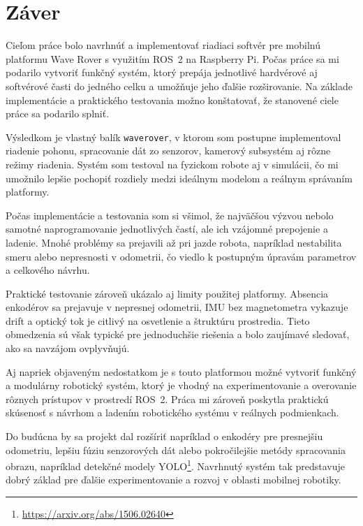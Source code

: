   \chapter{Záver}

  Cieľom práce bolo navrhnúť a implementovať riadiaci softvér pre mobilnú platformu Wave Rover s využitím ROS~2 na Raspberry Pi. Počas práce sa mi podarilo vytvoriť funkčný systém, ktorý prepája jednotlivé hardvérové aj softvérové časti do jedného celku a umožňuje jeho ďalšie rozširovanie. Na základe implementácie a praktického testovania možno konštatovať, že stanovené ciele práce sa podarilo splniť.

  Výsledkom je vlastný balík \texttt{waverover}, v ktorom som postupne implementoval riadenie pohonu, spracovanie dát zo senzorov, kamerový subsystém aj rôzne režimy riadenia. Systém som testoval na fyzickom robote aj v simulácii, čo mi umožnilo lepšie pochopiť rozdiely medzi ideálnym modelom a reálnym správaním platformy.

  Počas implementácie a testovania som si všimol, že najväčšou výzvou nebolo samotné naprogramovanie jednotlivých častí, ale ich vzájomné prepojenie a ladenie. Mnohé problémy sa prejavili až pri jazde robota, napríklad nestabilita smeru alebo nepresnosti v odometrii, čo viedlo k postupným úpravám parametrov a celkového návrhu.

  Praktické testovanie zároveň ukázalo aj limity použitej platformy. Absencia enkodérov sa prejavuje v nepresnej odometrii, IMU bez magnetometra vykazuje drift a optický tok je citlivý na osvetlenie a štruktúru prostredia. Tieto obmedzenia sú však typické pre jednoduchšie riešenia a bolo zaujímavé sledovať, ako sa navzájom ovplyvňujú.

  Aj napriek objaveným nedostatkom je s touto platformou možné vytvoriť funkčný a modulárny robotický systém, ktorý je vhodný na experimentovanie a overovanie rôznych prístupov v prostredí ROS~2. Práca mi zároveň poskytla praktickú skúsenosť s návrhom a ladením robotického systému v reálnych podmienkach.

  Do budúcna by sa projekt dal rozšíriť napríklad o enkodéry pre presnejšiu odometriu, lepšiu fúziu senzorových dát alebo pokročilejšie metódy spracovania obrazu, napríklad detekčné modely YOLO\footnote{\url{https://arxiv.org/abs/1506.02640}}. Navrhnutý systém tak predstavuje dobrý základ pre ďalšie experimentovanie a rozvoj v oblasti mobilnej robotiky.
      